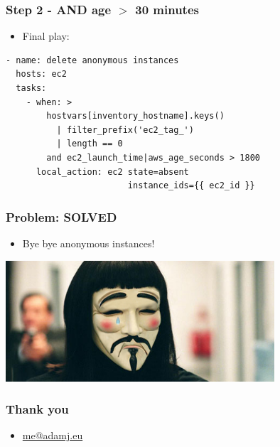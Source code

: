 \documentclass{beamer}
\begin{document}
\begin{frame}[fragile]\frametitle{Step 2 - AND age $>$ 30 minutes}

    \begin{itemize}
        \item Final play:
    \end{itemize}

    \begin{lstlisting}
- name: delete anonymous instances
  hosts: ec2
  tasks:
    - when: >
        hostvars[inventory_hostname].keys()
          | filter_prefix('ec2_tag_')
          | length == 0
        and ec2_launch_time|aws_age_seconds > 1800
      local_action: ec2 state=absent
                        instance_ids={{ ec2_id }}
    \end{lstlisting}

\end{frame}


\begin{frame}\frametitle{Problem: \textbf{SOLVED}}

    \begin{itemize}
        \item Bye bye anonymous instances!
    \end{itemize}

    \begin{center}
        \includegraphics[width=10cm]{sad-anonymous}
    \end{center}

\end{frame}


\begin{frame}\frametitle{Thank you}

    \begin{itemize}
        \item \url{me@adamj.eu}
    \end{itemize}

\end{frame}
\end{document}
